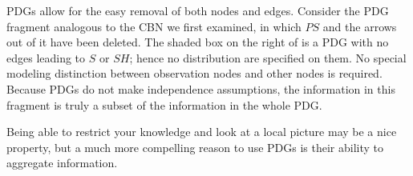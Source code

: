 \documentclass{article}
\newcommand{\MN}{PDG}
\numberwithin{equation}{section}
\begin{document}
\begin{example}[restriction]
PDGs allow for the easy removal of both nodes and edges. Consider the                                PDG fragment analogous to the CBN we first examined,
                in which $\mathit{PS}$ and the arrows out of it have
                been deleted. The shaded box on the right of
 is a PDG with
                no edges leading to $S$ or 
                $\mathit{SH}$; hence no distribution are specified on
                them.  No special modeling distinction between
                observation nodes and other nodes is required.  
		Because PDGs do not make independence assumptions, the
                information in this fragment is truly a subset of the
                information in the whole \MN. 		 
	\end{example}
	
 	Being able to restrict your knowledge and look at a local
        picture may be a nice property, but a much more compelling
        reason to use PDGs is their ability to aggregate information. 
	
\end{document}
